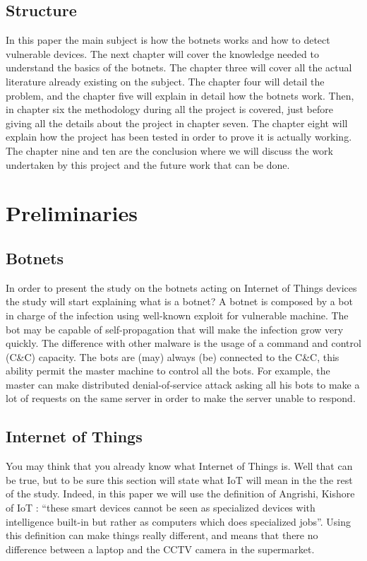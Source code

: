 \documentclass{report}
\begin{document}
\section{Structure}
In this paper the main subject is how the botnets works and how to detect vulnerable devices.\newline
The next chapter will cover the knowledge needed to understand the basics of the botnets. The chapter three will cover all the actual literature already existing on the subject.\newline
The chapter four will detail the problem, and the chapter five will explain in detail how the botnets work.\newline
Then, in chapter six the methodology during all the project is covered, just before giving all the details about the project in chapter seven. The chapter eight will explain how the project has been tested in order to prove it is actually working.\newline
The chapter nine and ten are the conclusion where we will discuss the work undertaken by this project and the future work that can be done.

\chapter{Preliminaries}
\section{Botnets}
In order to present the study on the botnets acting on Internet of Things devices the study will start explaining what is a botnet? A botnet is composed by a bot in charge of the infection using well-known exploit for vulnerable machine. The bot may be capable of self-propagation that will make the infection grow very quickly. The difference with other malware is the usage of a command and control (C\&C) capacity. The bots are (may) always (be) connected to the C\&C, this ability permit the master machine to control all the bots. For example, the master can make distributed denial-of-service attack asking all his bots to make a lot of requests on the same server in order to make the server unable to respond.

\section{Internet of Things}
\label{sec:preiot}
You may think that you already know what Internet of Things is. Well that can be true, but to be sure this section will state what IoT will mean in the the rest of the study. Indeed, in this paper we will use the definition of Angrishi, Kishore \autocite{angrishi2017turning} of IoT : ``these smart devices cannot be seen as specialized devices with intelligence built-in but rather as computers which does specialized jobs''. Using this definition can make things really different, and means that there no difference between a laptop and the CCTV camera in the supermarket.
\end{document}
